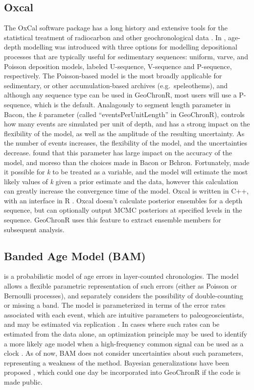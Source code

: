 \documentclass[gc, manuscript]{copernicus}
\begin{document}
\subsection{Oxcal}

The OxCal software package has a long history and extensive tools for
the statistical treatment of radiocarbon and other geochronological data
\citep{BronkRamsey95}. In \citet{ramsey2008deposition}, age-depth
modelling was introduced with three options for modelling depositional
processes that are typically useful for sedimentary sequences: uniform,
varve, and Poisson deposition models, labeled U-sequence, V-sequence and
P-sequence, respectively. The Poisson-based model is the most broadly
applicable for sedimentary, or other accumulation-based archives
(e.g.~speleothems), and although any sequence type can be used in
GeoChronR, most users will use a P-sequence, which is the default.
Analagously to segment length parameter in Bacon, the \emph{k} parameter
(called ``eventsPerUnitLength'' in GeoChronR), controls how many events
are simulated per unit of depth, and has a strong impact on the
flexibility of the model, as well as the amplitude of the resulting
uncertainty. As the number of events increases, the flexibility of the
model, and the uncertainties decrease. \citet{trachsel2017} found that
this parameter has large impact on the accuracy of the model, and moreso
than the choices made in Bacon or Bchron. Fortunately,
\citet{bronkramsey2010} made it possible for \emph{k} to be treated as a
variable, and the model will estimate the most likely values of \emph{k}
given a prior estimate and the data, however this calculation can
greatly increase the convergence time of the model. Oxcal is written in
C++, with an interface in R \citep{oxcAAR}. Oxcal doesn't calculate
posterior ensembles for a depth sequence, but can optionally output MCMC
posteriors at specified levels in the sequence. GeoChronR uses this
feature to extract ensemble members for subsequent analysis.

\subsection{Banded Age Model (BAM)}

\citet{BAM} is a probabilistic model of age errors in layer-counted
chronologies. The model allows a flexible parametric representation of
such errors (either as Poisson or Bernoulli processes), and separately
considers the possibility of double-counting or missing a band. The
model is parameterized in terms of the error rates associated with each
event, which are intuitive parameters to paleogeoscientists, and may be
estimated via replication \citep{DeLong_Paleo3_2013}. In cases where
such rates can be estimated from the data alone, an optimization
principle may be used to identify a more likely age model when a
high-frequency common signal can be used as a clock \citep{BAM}. As of
now, BAM does not consider uncertainties about such parameters,
representing a weakness of the method. Bayesian generalizations have
been proposed \citep{BoersCP2017}, which could one day be incorporated
into GeoChronR if the code is made public.
\end{document}
